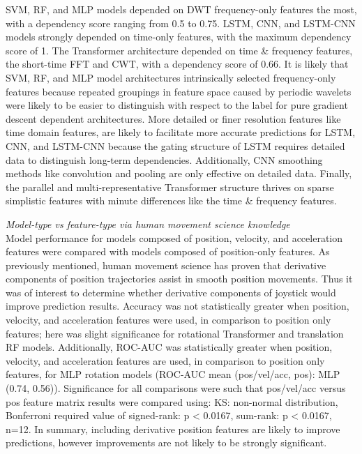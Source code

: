 \documentclass{ieeeaccess}
\begin{document}
SVM, RF, and MLP models depended on DWT frequency-only features the most, with a dependency score ranging from 0.5 to 0.75. LSTM, CNN, and LSTM-CNN models strongly depended on time-only features, with the maximum dependency score of 1. The Transformer architecture depended on time \& frequency features, the short-time FFT and CWT, with a dependency score of 0.66. It is likely that SVM, RF, and MLP model architectures intrinsically selected frequency-only features because repeated groupings in feature space caused by periodic wavelets were likely to be easier to distinguish with respect to the label for pure gradient descent dependent architectures. More detailed or finer resolution features like time domain features, are likely to facilitate more accurate predictions for LSTM, CNN, and LSTM-CNN because the gating structure of LSTM requires detailed data to distinguish long-term dependencies. Additionally, CNN smoothing methods like convolution and pooling are only effective on detailed data. Finally, the parallel and multi-representative Transformer structure thrives on sparse simplistic features with minute differences like the time \& frequency features. 



\noindent \emph{Model-type vs feature-type via human movement science knowledge}\\
Model performance for models composed of position, velocity, and acceleration features were compared with models composed of position-only features. As previously mentioned, human movement science has proven that derivative components of position trajectories assist in smooth position movements. Thus it was of interest to determine whether derivative components of joystick would improve prediction results. Accuracy was not statistically greater when position, velocity, and acceleration features were used, in comparison to position only features; here was slight significance for rotational Transformer and translation RF models. Additionally, ROC-AUC was statistically greater when position, velocity, and acceleration features are used, in comparison to position only features, for MLP rotation models (ROC-AUC mean (pos/vel/acc, pos): MLP (0.74, 0.56)). Significance for all comparisons were such that pos/vel/acc versus pos feature matrix results were compared using: KS: non-normal distribution, Bonferroni required value of signed-rank: p < 0.0167, sum-rank: p < 0.0167, n=12. In summary, including derivative position features are likely to improve predictions, however improvements are not likely to be strongly significant.
\end{document}
